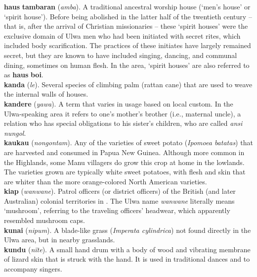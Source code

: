 \noindent \textbf{haus} \textbf{tambaran} (\textit{amba}). A traditional ancestral worship house (‘men’s house’ or ‘spirit house’). Before being abolished in the latter half of the twentieth century – that is, after the arrival of Christian missionaries – these ‘spirit houses’ were the exclusive domain of Ulwa men who had been initiated with secret rites, which included body scarification. The practices of these initiates have largely remained secret, but they are known to have included singing, dancing, and communal dining, sometimes on human flesh. In the  area, ‘spirit houses’ are also referred to as \textbf{haus} \textbf{boi}.\\

\noindent \textbf{kanda} (\textit{le}). Several species of climbing palm (rattan cane) that are used to weave the internal walls of houses.\\

\noindent \textbf{kandere} (\textit{yawa}). A  term that varies in usage based on local custom. In the Ulwa-speaking area it refers to one’s mother’s brother (i.e., maternal uncle), a relation who has special obligations to his sister’s children, who are called \textit{ansi nungol}.\\

\noindent \textbf{kaukau} (\textit{nongontam}). Any of the varieties of sweet potato (\textit{Ipomoea batatas}) that are harvested and consumed in Papua New Guinea. Although more common in the Highlands, some Manu villagers do grow this crop at home in the  lowlands. The varieties grown are typically white sweet potatoes, with flesh and skin that are whiter than the more orange-colored North American varieties.\\

\noindent \textbf{kiap} (\textit{wanwane}). Patrol officers (or district officers) of the British (and later Australian) colonial territories in . The Ulwa name \textit{wanwane} literally means ‘mushroom’, referring to the traveling officers’ headwear, which apparently resembled mushroom caps.\\

\noindent \textbf{kunai} (\textit{nipum}). A blade-like grass (\textit{Imperata cylindrica}) not found directly in the Ulwa area, but in nearby grasslands.\\

\noindent \textbf{kundu} (\textit{nïte}). A small hand drum with a body of wood and vibrating membrane of lizard skin that is struck with the hand. It is used in traditional dances and to accompany singers.\\

